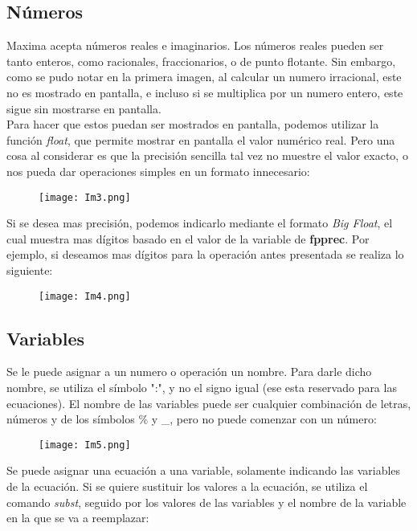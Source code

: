 \documentclass[12pt]{article}
\begin{document}
\subsection{Números}
Maxima acepta números reales e imaginarios. Los números reales pueden ser tanto enteros, como racionales, fraccionarios, o de punto flotante. Sin embargo, como se pudo notar en la primera imagen, al calcular un numero irracional, este no es mostrado en pantalla, e incluso si se multiplica por un numero entero, este sigue sin mostrarse en pantalla. \\

Para hacer que estos puedan ser mostrados en pantalla, podemos utilizar la función \textit{float}, que permite mostrar en pantalla el valor numérico real. Pero una cosa al considerar es que la precisión sencilla tal vez no muestre el valor exacto, o nos pueda dar operaciones simples en un formato innecesario: 

\begin{figure}[h!]
    \centering
\texttt{[image: Im3.png]}
\end{figure}

Si se desea mas precisión, podemos indicarlo mediante el formato \textit{Big Float}, el cual muestra mas dígitos basado en el valor de la variable de \textbf{fpprec}. Por ejemplo, si deseamos mas dígitos para la operación antes presentada se realiza lo siguiente:

\begin{figure}[h!]
    \centering
\texttt{[image: Im4.png]}
\end{figure}

\pagebreak

\subsection{Variables}
Se le puede asignar a un numero o operación un nombre. Para darle dicho nombre, se utiliza el símbolo ":", y no el signo igual (ese esta reservado para las ecuaciones). El nombre de las variables puede ser cualquier combinación de letras, números y de los símbolos \% y \_, pero no puede comenzar con un número:

\begin{figure}[h!]
    \centering
\texttt{[image: Im5.png]}
\end{figure}

Se puede asignar una ecuación a una variable, solamente indicando las variables de la ecuación. Si se quiere sustituir los valores a la ecuación, se utiliza el comando \textit{subst}, seguido por los valores de las variables y el nombre de la variable en la que se va a reemplazar:
\end{document}

